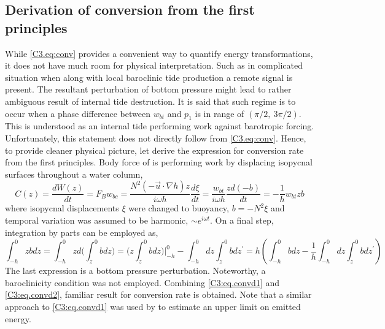 \documentclass[12pt]{article}
\begin{document}
\subsection{Derivation of conversion from the first principles}
\label{C3.app:B}
While \eqref{C3.eq:conv} provides a convenient way to quantify energy transformations, it does 
not have much room for physical interpretation. Such as in complicated situation when along with 
local baroclinic tide production a remote signal is present. The resultant perturbation of bottom 
pressure might lead to rather ambiguous result of internal tide destruction. It is said that such 
regime is to occur when a phase difference between $w_{bt}$ and $p_{1}$ is in range of 
$(\pi/2,~3\pi/2)$. This is understood as an internal tide performing work against barotropic 
forcing. Unfortunately, this statement does not directly follow from \eqref{C3.eq:conv}. Hence, to 
provide cleaner physical picture, let derive the expression for conversion rate from the first 
principles. Body force of \citep{baines1982internal} is performing work by displacing isopycnal 
surfaces 
throughout a water column,
\begin{equation}
\label{C3:eq.convd1}
C(z) = \frac{dW(z)}{dt} = F_{B} w_{bc} = \frac{N^2 (-\vec{u} \cdot \nabla h) z}{i \omega h} 
\frac{d 
\xi}{dt} = \frac{w_{bt}}{i \omega h} \frac{z d(-b)}{dt} = -\frac{1}{h} w_{bt} zb
\end{equation}
where isopycnal displacements $\xi$ were changed to buoyancy, $b = -N^2 \xi$ and temporal 
variation 
was assumed to be harmonic, $\sim e^{i \omega t}$. On a final step, integration by parts can be 
employed as,
\begin{equation}
\label{C3:eq.convd2}
\int_{-h}^{0} z b dz = \int_{-h}^{0} z d \big( \int^0_{z} b dz \big) = \big( z \int^0_{z} b dz 
\big)\big|_{-h}^0 - \int_{-h}^{0} dz \int_{z}^{0} b dz^{\prime} = h (\int_{-h}^{0}b dz - 
\frac{1}{h} \int_{-h}^{0} dz \int_{z}^{0} b dz^{\prime})
\end{equation}
The last expression is a bottom pressure perturbation. Noteworthy, a baroclinicity condition was 
not employed. Combining \eqref{C3:eq.convd1} and \eqref{C3:eq.convd2}, familiar result 
for conversion rate is obtained. Note that a similar approach to \eqref{C3:eq.convd1} was used 
by \citep{nash2006structure} to estimate an upper limit on emitted energy.\\
\end{document}
